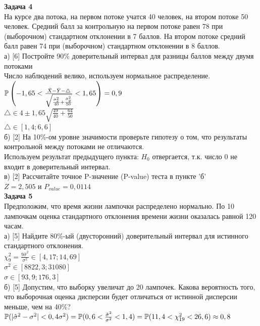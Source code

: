 \documentclass[12pt, a4paper]{article}\usepackage[]{graphicx}\usepackage[]{color}
\begin{document}
	{\bf Задача 4} \\
	На курсе два потока, на первом потоке учатся 40 человек, на втором
	потоке 50 человек. Средний балл за контрольную на первом потоке
	равен 78 при (выборочном) стандартном отклонении в 7 баллов. На
	втором потоке средний балл равен 74 при (выборочном) стандартном
	отклонении в 8 баллов. \\
	а) [6] Постройте 90\% доверительный интервал для разницы баллов
	между
	двумя потоками \\
	Число наблюдений велико, используем нормальное распределение. \\
	$\P\left(-1,65<\frac{\bar{X}-\bar{Y}-\triangle}{\sqrt{\frac{\hat{\sigma}_{x}^{2}}{40}+\frac{\hat{\sigma}_{y}^{2}}{50}}}<1,65\right)=0,9$ \\
	$\triangle \in 4 \pm 1,65\sqrt{\frac{49}{40}+\frac{64}{50}}$ \\
	$\triangle \in [1,4;6,6]$ \\
	б) [2] На 10\%-ом уровне значимости проверьте
	гипотезу о том, что
	результаты контрольной между потоками не отличаются. \\
	Используем результат предыдущего пункта: $H_{0}$ отвергается, т.к.
	число 0 не входит в доверительный интервал. \\
	в) [2] Рассчитайте точное P-значение (P-value) теста в пункте 'б' \\
	$Z=2,505$ и $P_{value}=0,0114$ \\

	{\bf Задача 5} \\
	Предположим, что время жизни лампочки распределено нормально. По
	10 лампочкам оценка стандартного отклонения времени жизни
	оказалась равной 120 часам. \\
	а) [5] Найдите 80\%-ый (двусторонний)
	доверительный интервал для истинного стандартного отклонения. \\
	$\chi_{9}^{2}=\frac{9\hat{\sigma}^{2}}{\sigma^{2}} \in [4,17;14,69]$ \\
	$\sigma^{2} \in [8822,3;31080]$ \\
	$\sigma \in [93,9;176,3] $ \\
	б) [5] Допустим, что выборку увеличат до 20 лампочек. Какова
	вероятность того, что выборочная оценка дисперсии будет отличаться
	от истинной дисперсии меньше, чем на 40\%? \\
	$\P(|\hat{\sigma}^{2}-\sigma^{2}|<0,4\sigma^{2})=
	\P(0,6<\frac{\hat{\sigma}^{2}}{\sigma^{2}}<1,4)=
	\P(11,4<\chi_{19}^{2}<26,6)\approx 0,8$ \\
\end{document}
